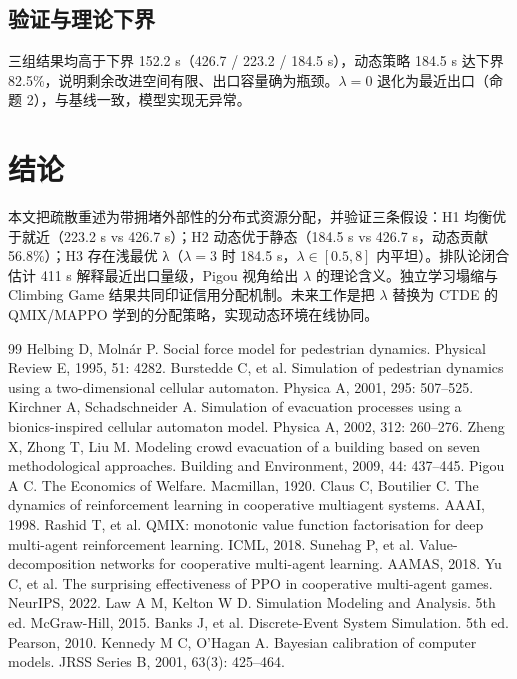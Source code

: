 ﻿\documentclass[withoutpreface,bwprint]{cumcmthesis}
\begin{document}
\subsection{验证与理论下界}
三组结果均高于下界 152.2 s（426.7 / 223.2 / 184.5 s），动态策略 184.5 s 达下界 82.5\%，说明剩余改进空间有限、出口容量确为瓶颈。$\lambda=0$ 退化为最近出口（命题 2），与基线一致，模型实现无异常。

\section{结论}
本文把疏散重述为带拥堵外部性的分布式资源分配，并验证三条假设：H1 均衡优于就近（223.2 s vs 426.7 s）；H2 动态优于静态（184.5 s vs 426.7 s，动态贡献 56.8\%）；H3 存在浅最优 λ（$\lambda=3$ 时 184.5 s，$\lambda\in[0.5,8]$ 内平坦）。排队论闭合估计 411 s 解释最近出口量级，Pigou 视角给出 $\lambda$ 的理论含义。独立学习塌缩与 Climbing Game 结果共同印证信用分配机制。未来工作是把 $\lambda$ 替换为 CTDE 的 QMIX/MAPPO 学到的分配策略，实现动态环境在线协同。

\begin{thebibliography}{99}
 Helbing D, Molnár P. Social force model for pedestrian dynamics. Physical Review E, 1995, 51: 4282.
 Burstedde C, et al. Simulation of pedestrian dynamics using a two-dimensional cellular automaton. Physica A, 2001, 295: 507--525.
 Kirchner A, Schadschneider A. Simulation of evacuation processes using a bionics-inspired cellular automaton model. Physica A, 2002, 312: 260--276.
 Zheng X, Zhong T, Liu M. Modeling crowd evacuation of a building based on seven methodological approaches. Building and Environment, 2009, 44: 437--445.
 Pigou A C. The Economics of Welfare. Macmillan, 1920.
 Claus C, Boutilier C. The dynamics of reinforcement learning in cooperative multiagent systems. AAAI, 1998.
 Rashid T, et al. QMIX: monotonic value function factorisation for deep multi-agent reinforcement learning. ICML, 2018.
 Sunehag P, et al. Value-decomposition networks for cooperative multi-agent learning. AAMAS, 2018.
 Yu C, et al. The surprising effectiveness of PPO in cooperative multi-agent games. NeurIPS, 2022.
 Law A M, Kelton W D. Simulation Modeling and Analysis. 5th ed. McGraw-Hill, 2015.
 Banks J, et al. Discrete-Event System Simulation. 5th ed. Pearson, 2010.
 Kennedy M C, O'Hagan A. Bayesian calibration of computer models. JRSS Series B, 2001, 63(3): 425--464.
\end{thebibliography}
\end{document}
